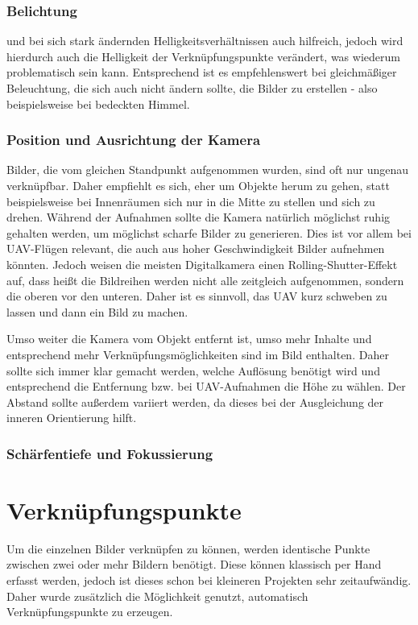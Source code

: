 \documentclass[./00PhotoBox.tex]{subfiles}
\begin{document}
\subsubsection{Belichtung}
und bei sich stark ändernden Helligkeitsverhältnissen auch hilfreich, jedoch wird hierdurch auch die Helligkeit der Verknüpfungspunkte verändert, was wiederum problematisch sein kann. Entsprechend ist es empfehlenswert bei gleichmäßiger Beleuchtung, die sich auch nicht ändern sollte, die Bilder zu erstellen - also beispielsweise bei bedeckten Himmel.

\subsubsection{Position und Ausrichtung der Kamera}
Bilder, die vom gleichen Standpunkt aufgenommen wurden, sind oft nur ungenau verknüpfbar. Daher empfiehlt es sich, eher um Objekte herum zu gehen, statt beispielsweise bei Innenräumen sich nur in die Mitte zu stellen und sich zu drehen. Während der Aufnahmen sollte die Kamera natürlich möglichst ruhig gehalten werden, um möglichst scharfe Bilder zu generieren. Dies ist vor allem bei UAV-Flügen relevant, die auch aus hoher Geschwindigkeit Bilder aufnehmen könnten. Jedoch weisen die meisten Digitalkamera einen Rolling-Shutter-Effekt auf, dass heißt die Bildreihen werden nicht alle zeitgleich aufgenommen, sondern die oberen vor den unteren. Daher ist es sinnvoll, das UAV kurz schweben zu lassen und dann ein Bild zu machen. \citep[S. 147]{opendronemap}

Umso weiter die Kamera vom Objekt entfernt ist, umso mehr Inhalte und entsprechend mehr Verknüpfungsmöglichkeiten sind im Bild enthalten. Daher sollte sich immer klar gemacht werden, welche Auflösung benötigt wird und entsprechend die Entfernung bzw. bei UAV-Aufnahmen die Höhe zu wählen. Der Abstand sollte außerdem variiert werden, da dieses bei der Ausgleichung der inneren Orientierung hilft. \citep[S. 144f]{opendronemap}

\subsubsection{Schärfentiefe und Fokussierung}


\section{Verknüpfungspunkte}
Um die einzelnen Bilder verknüpfen zu können, werden identische Punkte zwischen zwei oder mehr Bildern benötigt. Diese können klassisch per Hand erfasst werden, jedoch ist dieses schon bei kleineren Projekten sehr zeitaufwändig. Daher wurde zusätzlich die Möglichkeit genutzt, automatisch Verknüpfungspunkte zu erzeugen.
\end{document}
